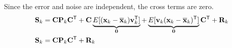 Since the error and noise are independent, the cross terms are zero.
\begin{align*}
  \mathbf{S}_k &= \mathbf{C}\mathbf{P}_k\mathbf{C}^\mathsf{T} +
    \mathbf{C}\underbrace{E[(\mathbf{x}_k - \overline{\mathbf{x}}_k)\mathbf{v}_k^\mathsf{T}]}_{\mathbf{0}} +
    \underbrace{
      E[\mathbf{v}_k(\mathbf{x}_k - \overline{\mathbf{x}}_k)^\mathsf{T}]}_{\mathbf{0}}\mathbf{C}^\mathsf{T} + \mathbf{R}_k \\
  \mathbf{S}_k &= \mathbf{C}\mathbf{P}_k\mathbf{C}^\mathsf{T} + \mathbf{R}_k
\end{align*}

